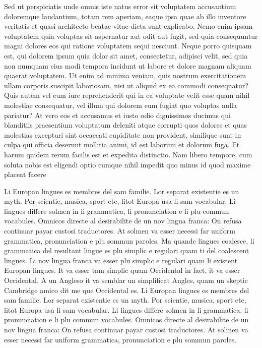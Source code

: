 Sed ut perspiciatis unde omnis iste natus error sit voluptatem accusantium 
doloremque laudantium, totam rem aperiam, eaque ipsa quae ab illo inventore 
veritatis et quasi architecto beatae vitae dicta sunt explicabo. Nemo enim ipsam 
voluptatem quia voluptas sit aspernatur aut odit aut fugit, sed quia 
consequuntur magni dolores eos qui ratione voluptatem sequi nesciunt. Neque 
porro quisquam est, qui dolorem ipsum quia dolor sit amet, consectetur, adipisci 
velit, sed quia non numquam eius modi tempora incidunt ut labore et dolore 
magnam aliquam quaerat voluptatem. Ut enim ad minima veniam, quis nostrum 
exercitationem ullam corporis suscipit laboriosam, nisi ut aliquid ex ea commodi 
consequatur? Quis autem vel eum iure reprehenderit qui in ea voluptate velit 
esse quam nihil molestiae consequatur, vel illum qui dolorem eum fugiat quo 
voluptas nulla pariatur? At vero eos et accusamus et iusto odio dignissimos 
ducimus qui blanditiis praesentium voluptatum deleniti atque corrupti quos 
dolores et quas molestias excepturi sint occaecati cupiditate non provident, 
similique sunt in culpa qui officia deserunt mollitia animi, id est laborum et 
dolorum fuga. Et harum quidem rerum facilis est et expedita distinctio. Nam 
libero tempore, cum soluta nobis est eligendi optio cumque nihil impedit quo 
minus id quod maxime placeat facere 

Li Europan lingues es membres del sam familie. Lor separat existentie es un 
myth. Por scientie, musica, sport etc, litot Europa usa li sam vocabular. Li 
lingues differe solmen in li grammatica, li pronunciation e li plu commun 
vocabules. Omnicos directe al desirabilite de un nov lingua franca: On refusa 
continuar payar custosi traductores. At solmen va esser necessi far uniform 
grammatica, pronunciation e plu sommun paroles. Ma quande lingues coalesce, li 
grammatica del resultant lingue es plu simplic e regulari quam ti del coalescent 
lingues. Li nov lingua franca va esser plu simplic e regulari quam li existent 
Europan lingues. It va esser tam simplic quam Occidental in fact, it va esser 
Occidental. A un Angleso it va semblar un simplificat Angles, quam un skeptic 
Cambridge amico dit me que Occidental es. Li Europan lingues es membres del sam 
familie. Lor separat existentie es un myth. Por scientie, musica, sport etc, 
litot Europa usa li sam vocabular. Li lingues differe solmen in li grammatica, 
li pronunciation e li plu commun vocabules. Omnicos directe al desirabilite de 
un nov lingua franca: On refusa continuar payar custosi traductores. At solmen 
va esser necessi far uniform grammatica, pronunciation e plu sommun paroles. 

 